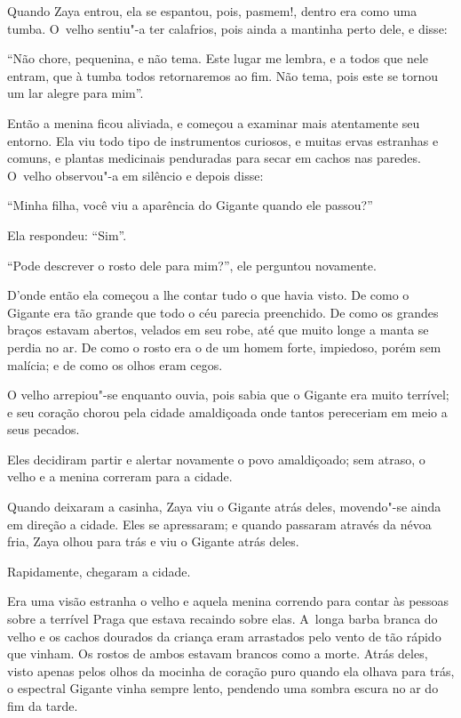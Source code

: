 Quando Zaya entrou, ela se espantou, pois, pasmem!, dentro era como uma
tumba. O~velho sentiu"-a ter calafrios, pois ainda a mantinha perto dele,
e disse:

``Não chore, pequenina, e não tema. Este lugar me lembra, e a todos que
nele entram, que à tumba todos retornaremos ao fim. Não tema, pois este
se tornou um lar alegre para mim''.

Então a menina ficou aliviada, e começou a examinar mais atentamente seu
entorno. Ela viu todo tipo de instrumentos curiosos, e muitas ervas
estranhas e comuns, e plantas medicinais penduradas para secar em cachos
nas paredes. O~velho observou"-a em silêncio e depois disse:

``Minha filha, você viu a aparência do Gigante quando ele passou?''

Ela respondeu: ``Sim''.

``Pode descrever o rosto dele para mim?'', ele perguntou novamente.

D'onde então ela começou a lhe contar tudo o que havia visto. De como o
Gigante era tão grande que todo o céu parecia preenchido. De como os
grandes braços estavam abertos, velados em seu robe, até que muito longe
a manta se perdia no ar. De como o rosto era o de um homem forte,
impiedoso, porém sem malícia; e de como os olhos eram cegos.

O velho arrepiou"-se enquanto ouvia, pois sabia que o Gigante era muito
terrível; e seu coração chorou pela cidade amaldiçoada onde tantos
pereceriam em meio a seus pecados.

Eles decidiram partir e alertar novamente o povo amaldiçoado; sem
atraso, o velho e a menina correram para a cidade.

Quando deixaram a casinha, Zaya viu o Gigante atrás deles, movendo"-se
ainda em direção a cidade. Eles se apressaram; e quando passaram através
da névoa fria, Zaya olhou para trás e viu o Gigante atrás deles.

Rapidamente, chegaram a cidade.

Era uma visão estranha o velho e aquela menina correndo para contar às
pessoas sobre a terrível Praga que estava recaindo sobre elas. A~longa
barba branca do velho e os cachos dourados da criança eram arrastados
pelo vento de tão rápido que vinham. Os rostos de ambos estavam brancos
como a morte. Atrás deles, visto apenas pelos olhos da mocinha de
coração puro quando ela olhava para trás, o espectral Gigante vinha
sempre lento, pendendo uma sombra escura no ar do fim da tarde.

